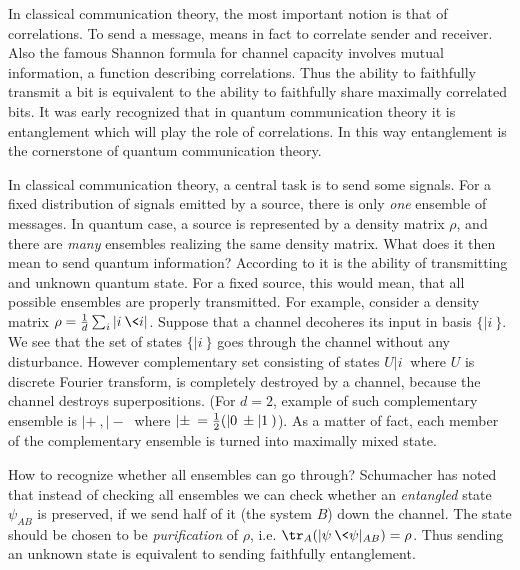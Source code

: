 \documentclass[rmp,12pt,preprint]{revtex4-2}
\begin{document}
In classical communication theory, the most important notion is that
of correlations. To send a message, means in fact to correlate
sender and receiver. Also the famous Shannon formula for channel
capacity involves mutual information, a function describing
correlations. Thus the ability to faithfully transmit a bit is
equivalent to the ability to faithfully share maximally correlated
bits. It was early recognized that in quantum communication theory
it is entanglement which will play the role of correlations. In this
way entanglement is the cornerstone of quantum communication theory.

In classical communication theory, a central task is to send some
signals. For a fixed distribution of signals emitted by a source,
there is only {\it one} ensemble of messages.  In quantum case, a
source is represented by a density matrix $\rho$, and there are {\it
many} ensembles realizing the same density matrix. What does it then
mean to send quantum information? According to \cite{Teleportation}
it is the ability of transmitting and unknown quantum state. For a
fixed source, this would mean, that all possible ensembles are
properly transmitted. For example, consider a density matrix
$\rho={1\over d} \sum_i |i\>\<i|$. Suppose that a channel decoheres
its input  in basis $\{|i\>\}$. We see that the set of states
$\{|i\>\}$ goes through the channel without any
disturbance. However complementary set consisting of states
$U|i\>$ where $U$ is discrete Fourier transform, is completely
destroyed by a channel, because the channel destroys superpositions.
(For $d=2$, example of such complementary ensemble is $|+\>,|-\>$
where $|\pm\>={1\over 2} (|0\>\pm|1\>)$).
As a matter of fact, each member of the complementary ensemble is
turned into maximally mixed state.

How to recognize whether all ensembles can go through?  Schumacher
has noted \cite{Schumacher1995} that instead of checking all
ensembles we can check
whether an {\it entangled} state $\psi_{AB}$ is preserved, if we send half
of it (the system $B$) down the channel. The state should be chosen
to be {\it purification} of $\rho$, i.e.
$\tr_A(|\psi\>\<\psi|_{AB})=\rho$. Thus sending an unknown state is
equivalent to sending faithfully entanglement.
\end{document}
